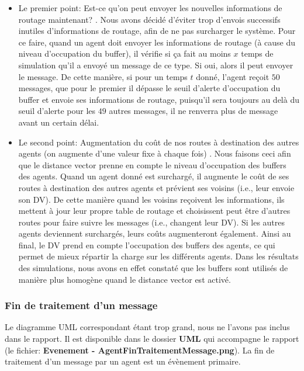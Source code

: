 \documentclass[a4paper,11pt]{article}
\begin{document}
\begin{itemize}
 \item Le premier point: \og Est-ce qu'on peut envoyer les nouvelles informations de routage maintenant? \fg. Nous avons décidé d'éviter trop d'envois successifs inutiles d'informations de routage, afin de ne pas surcharger le système. Pour ce faire, quand un agent doit envoyer les informations de routage (à cause du niveau d'occupation du buffer), il vérifie si ça fait au moins $x$ temps de simulation qu'il a envoyé un message de ce type. Si oui, alors il peut envoyer le message. De cette manière, si pour un temps $t$ donné, l'agent reçoit $50$ messages, que pour le premier il dépasse le seuil d'alerte d'occupation du buffer et envoie ses informations de routage, puisqu'il sera toujours au delà du seuil d'alerte pour les $49$ autres messages, il ne renverra plus de message avant un certain délai.
 
 \item Le second point: \og Augmentation du coût de nos routes à destination des autres agents (on augmente d'une valeur fixe à chaque fois) \fg. Nous faisons ceci afin que le distance vector prenne en compte le niveau d'occupation des buffers des agents. Quand un agent donné est surchargé, il augmente le coût de ses routes à destination des autres agents et prévient ses voisins (i.e., leur envoie son DV). De cette manière quand les voisins reçoivent les informations, ils mettent à jour leur propre table de routage et choisissent peut être d'autres routes pour faire suivre les messages (i.e., changent leur DV). Si les autres agents deviennent surchargés, leurs coûts augmenteront également. Ainsi au final, le DV prend en compte l'occupation des buffers des agents, ce qui permet de mieux répartir la charge sur les différents agents. Dans les résultats des simulations, nous avons en effet constaté que les buffers sont utilisés de manière plus homogène quand le distance vector est activé.
\end{itemize}





\subsubsection{Fin de traitement d'un message}
Le diagramme UML correspondant étant trop grand, nous ne l'avons pas inclus dans le rapport. Il est disponible dans le dossier \textbf{UML} qui accompagne le rapport (le fichier: \textbf{Evenement - AgentFinTraitementMessage.png}). La fin de traitement d'un message par un agent est un évènement primaire.
\end{document}
